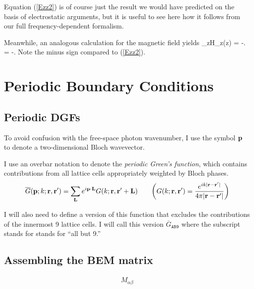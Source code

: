 \documentclass[letterpaper]{article}
\begin{document}
Equation (\ref{Ezz2}) is of course just the result we 
would have predicted on the basis of electrostatic 
arguments, but it is useful to see here how it follows 
from our full frequency-dependent formalism.

Meanwhile, an analogous calculation for the magnetic field yields
{\lim_{z}H_z(z) 
   = -.
   = -.
}
Note the minus sign compared to (\ref{Ezz2}).

\newpage
\newcommand{\GBar}{\overline{G}}

\section{Periodic Boundary Conditions}

\subsection{Periodic DGFs}

To avoid confusion with the free-space photon wavenumber, 
I use the symbol $\mathbf{p}$ to denote a two-dimensional 
Bloch wavevector.

I use an overbar notation to denote the 
\textit{periodic Green's function}, which contains contributions
from all lattice cells appropriately weighted by Bloch phases.
$$
  \GBar(\vb p; k; \vb r, \vb r^\prime)
= \sum_{\vb L} e^{i \vb p \cdot \vb L} G(k; \vb r, \vb r^\prime+\vb L)
\qquad 
 \bigg( G(k; \vb r, \vb r^\prime) 
 = \frac{e^{ik|\vb r-\vb r^\prime|}}{4\pi|\vb r-\vb r^\prime|}
 \bigg)
$$

I will also need to define a version of this function that 
excludes the contributions of the innermost 9 lattice cells.
I will call this version 
$\GBar_{\texttt{AB9}}$
where the subscript stands for 
stands for ``all but 9.''

\subsection{Assembling the BEM matrix}

\begin{align*}
M_{\alpha\beta}
\end{align*}

\appendix

 
 
 
\end{document}
